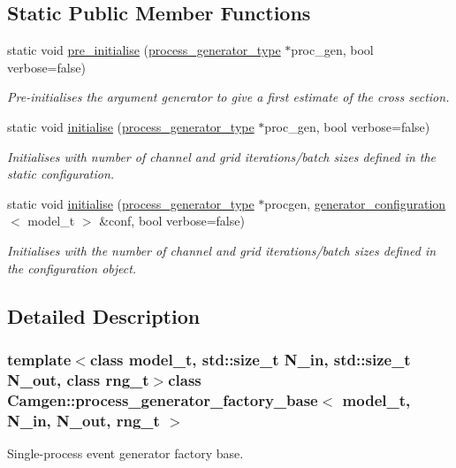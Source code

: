 \subsection*{Static Public Member Functions}
\begin{DoxyCompactItemize}
\item 
static void \hyperlink{a00438_a919021f2929b8bbf106ed47acae993f3}{pre\+\_\+initialise} (\hyperlink{a00436}{process\+\_\+generator\+\_\+type} $\ast$proc\+\_\+gen, bool verbose=false)
\begin{DoxyCompactList}\small\item\em Pre-\/initialises the argument generator to give a first estimate of the cross section. \end{DoxyCompactList}\item 
static void \hyperlink{a00438_a27999b4b8d67a5b03c2073c96b7a69bc}{initialise} (\hyperlink{a00436}{process\+\_\+generator\+\_\+type} $\ast$proc\+\_\+gen, bool verbose=false)
\begin{DoxyCompactList}\small\item\em Initialises with number of channel and grid iterations/batch sizes defined in the static configuration. \end{DoxyCompactList}\item 
static void \hyperlink{a00438_a4157c2cfeceb93c23440d113e16a7e4c}{initialise} (\hyperlink{a00436}{process\+\_\+generator\+\_\+type} $\ast$procgen, \hyperlink{a00241}{generator\+\_\+configuration}$<$ model\+\_\+t $>$ \&conf, bool verbose=false)
\begin{DoxyCompactList}\small\item\em Initialises with the number of channel and grid iterations/batch sizes defined in the configuration object. \end{DoxyCompactList}\end{DoxyCompactItemize}


\subsection{Detailed Description}
\subsubsection*{template$<$class model\+\_\+t, std\+::size\+\_\+t N\+\_\+in, std\+::size\+\_\+t N\+\_\+out, class rng\+\_\+t$>$class Camgen\+::process\+\_\+generator\+\_\+factory\+\_\+base$<$ model\+\_\+t, N\+\_\+in, N\+\_\+out, rng\+\_\+t $>$}

Single-\/process event generator factory base. 

